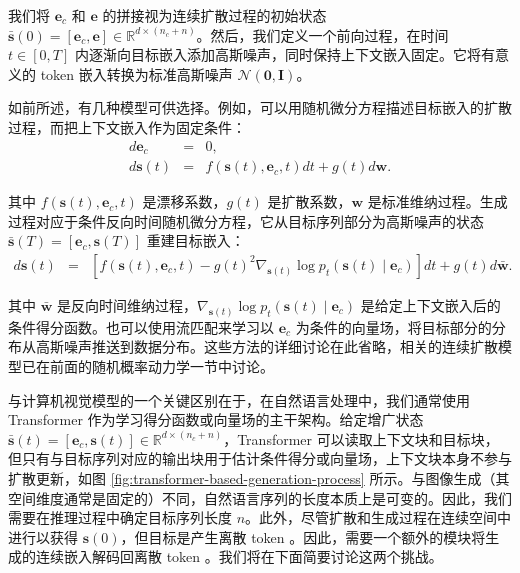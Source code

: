 \documentclass[UTF8,a4paper,zihao=-4,oneside,openany]{ctexbook}
\begin{document}
我们将 $\mathbf{e}_c$ 和 $\mathbf{e}$ 的拼接视为连续扩散过程的初始状态 $\bar{\mathbf{s}}(0) = [\mathbf{e}_c,\mathbf{e}] \in \mathbb{R}^{d \times (n_c + n)}$。然后，我们定义一个前向过程，在时间 $t \in [0, T]$ 内逐渐向目标嵌入添加高斯噪声，同时保持上下文嵌入固定。它将有意义的 token 嵌入转换为标准高斯噪声 $\mathcal{N}(\mathbf{0}, \mathbf{I})$。

如前所述，有几种模型可供选择。例如，可以用随机微分方程描述目标嵌入的扩散过程，而把上下文嵌入作为固定条件：
\begin{eqnarray}
d\mathbf{e}_c & = & 0, \nonumber\\
d \mathbf{s}(t) & = & f(\mathbf{s}(t),\mathbf{e}_c,t) d t + g(t) d\mathbf{w}.
\label{eq:diffusion-embedding}\label{eq:diffusion-embedding-nobar}
\end{eqnarray}

\noindent 其中 $f(\mathbf{s}(t),\mathbf{e}_c,t)$ 是漂移系数，$g(t)$ 是扩散系数，$\mathbf{w}$ 是标准维纳过程。生成过程对应于条件反向时间随机微分方程，它从目标序列部分为高斯噪声的状态 $\bar{\mathbf{s}}(T)=[\mathbf{e}_c,\mathbf{s}(T)]$ 重建目标嵌入：
\begin{eqnarray}
d \mathbf{s}(t) & = & \left[f(\mathbf{s}(t),\mathbf{e}_c,t)-g(t)^2\nabla_{\mathbf{s}(t)}
\log p_t(\mathbf{s}(t)\mid\mathbf{e}_c)\right]dt+g(t)d\bar{\mathbf{w}}.
\label{eq:generation-embedding}\label{eq:generation-embedding-nobar}
\end{eqnarray}

\noindent 其中 $\bar{\mathbf{w}}$ 是反向时间维纳过程，$\nabla_{\mathbf{s}(t)}\log p_t(\mathbf{s}(t)\mid\mathbf{e}_c)$ 是给定上下文嵌入后的条件得分函数。也可以使用流匹配来学习以 $\mathbf{e}_c$ 为条件的向量场，将目标部分的分布从高斯噪声推送到数据分布。这些方法的详细讨论在此省略，相关的连续扩散模型已在前面的随机概率动力学一节中讨论。

与计算机视觉模型的一个关键区别在于，在自然语言处理中，我们通常使用 Transformer 作为学习得分函数或向量场的主干架构。给定增广状态 $\bar{\mathbf{s}}(t) = [\mathbf{e}_c, \mathbf{s}(t)] \in \mathbb{R}^{d \times (n_c + n)}$，Transformer 可以读取上下文块和目标块，但只有与目标序列对应的输出块用于估计条件得分或向量场，上下文块本身不参与扩散更新，如图 \ref{fig:transformer-based-generation-process} 所示。与图像生成（其空间维度通常是固定的）不同，自然语言序列的长度本质上是可变的。因此，我们需要在推理过程中确定目标序列长度 $n$。此外，尽管扩散和生成过程在连续空间中进行以获得 $\mathbf{s}(0)$，但目标是产生离散 token 。因此，需要一个额外的模块将生成的连续嵌入解码回离散 token 。我们将在下面简要讨论这两个挑战。
\end{document}
